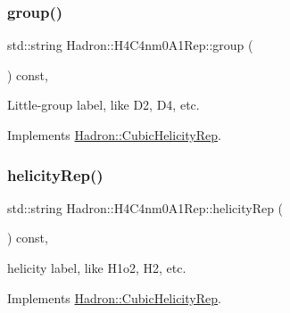 \mbox{\label{structHadron_1_1H4C4nm0A1Rep_ac03a34ff386fa824b479f98878531f7b}} 
\subsubsection{\texorpdfstring{group()}{group()}\hspace{0.1cm}{\footnotesize\ttfamily [5/5]}}
{\footnotesize\ttfamily std\+::string Hadron\+::\+H4\+C4nm0\+A1\+Rep\+::group (\begin{DoxyParamCaption}{ }\end{DoxyParamCaption}) const\hspace{0.3cm}{\ttfamily [inline]}, {\ttfamily [virtual]}}

Little-\/group label, like D2, D4, etc. 

Implements \mbox{\hyperlink{structHadron_1_1CubicHelicityRep_a101a7d76cd8ccdad0f272db44b766113}{Hadron\+::\+Cubic\+Helicity\+Rep}}.

\mbox{\label{structHadron_1_1H4C4nm0A1Rep_af7a02623676d7d91efa31e3daf15ed8c}} 
\subsubsection{\texorpdfstring{helicityRep()}{helicityRep()}\hspace{0.1cm}{\footnotesize\ttfamily [1/3]}}
{\footnotesize\ttfamily std\+::string Hadron\+::\+H4\+C4nm0\+A1\+Rep\+::helicity\+Rep (\begin{DoxyParamCaption}{ }\end{DoxyParamCaption}) const\hspace{0.3cm}{\ttfamily [inline]}, {\ttfamily [virtual]}}

helicity label, like H1o2, H2, etc. 

Implements \mbox{\hyperlink{structHadron_1_1CubicHelicityRep_af1096946b7470edf0a55451cc662f231}{Hadron\+::\+Cubic\+Helicity\+Rep}}.

\mbox{\label{structHadron_1_1H4C4nm0A1Rep_af7a02623676d7d91efa31e3daf15ed8c}} 
